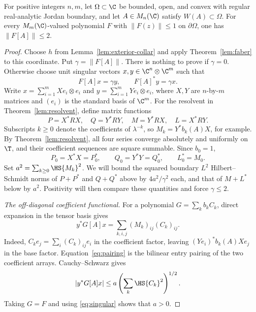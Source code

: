 \begin{theorem}\label{thm:domain}
For positive integers $n,m$, let $\Omega\subset\C$ be bounded, open, and convex with regular real-analytic Jordan boundary, and let $A\in M_n(\C)$ satisfy $W(A)\subset\Omega$. For every $M_m(\C)$-valued polynomial $F$ with $\|F(z)\|\le1$ on $\partial\Omega$, one has $\|F[A]\|\le2$.
\end{theorem}
\begin{proof}
Choose $h$ from Lemma~\ref{lem:exterior-collar} and apply
Theorem~\ref{lem:faber} to this coordinate.
Put $\gamma=\|F[A]\|$. There is nothing to prove if $\gamma=0$. Otherwise choose unit singular vectors $x,y\in\C^n\otimes\C^m$ such that
\begin{equation}\label{eq:singular}
 F[A]x=\gamma y,\qquad F[A]^*y=\gamma x.
\end{equation}
Write $x=\sum_{i=1}^mXe_i\otimes e_i$ and $y=\sum_{i=1}^mYe_i\otimes e_i$, where $X,Y$ are $n$-by-$m$ matrices and $(e_i)$ is the standard basis of $\C^m$. For the resolvent in Theorem~\ref{lem:resolvent}, define matrix functions
\[
 P=X^*RX,\quad Q=Y^*RY,\quad M=Y^*RX,\quad L=X^*RY.
\]
Subscripts $k\ge0$ denote the coefficients of $\lambda^{-k}$, so $M_k=Y^*b_k(A)X$, for example. By Theorem~\ref{lem:resolvent}, all four series converge absolutely and uniformly on $\T$, and their coefficient sequences are square summable. Since $b_0=1$,
\begin{equation}\label{eq:means}
 P_0=X^*X=P_0^*,\qquad Q_0=Y^*Y=Q_0^*,\qquad L_0^*=M_0.
\end{equation}
Set $a^2=\sum_{k\ge0}\HS{M_k}^2$. We will bound the squared
boundary $L^2$ Hilbert--Schmidt norms of $P+P^*$ and $Q+Q^*$
above by $4a^2/\gamma^2$ each, and that of $M+L^*$ below by $a^2$.
Positivity will then compare these quantities and force $\gamma\le2$.

\emph{The off-diagonal coefficient functional.}
For a polynomial $G=\sum_k b_kC_k$, direct expansion in the tensor basis gives
\begin{equation}\label{eq:pairing}
 y^*G[A]x=\sum_{k,i,j}(M_k)_{ij}(C_k)_{ij}.
\end{equation}
Indeed, $C_ke_j=\sum_i(C_k)_{ij}e_i$ in the coefficient factor, leaving $(Ye_i)^*b_k(A)Xe_j$ in the base factor. Equation~\eqref{eq:pairing} is the bilinear entry pairing of the two coefficient arrays. Cauchy--Schwarz gives
\begin{equation}\label{eq:crossfunctional}
 |y^*G[A]x|\le a\left(\sum_k\HS{C_k}^2\right)^{1/2}.
\end{equation}
Taking $G=F$ and using \eqref{eq:singular} shows that $a>0$.


\end{proof}
